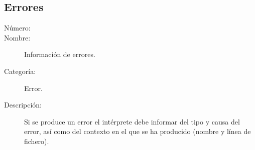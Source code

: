 \subsection{Errores}
\begin{framed}
	\begin{description}
		\item [Número:] \cn
		\item [Nombre:] Información de errores.
		\item [Categoría:] Error.
		\item [Descripción:] Si se produce un error el intérprete debe informar del tipo y causa del error, así como del contexto en el que se ha producido (nombre y línea de fichero).
	\end {description}
\end{framed}
